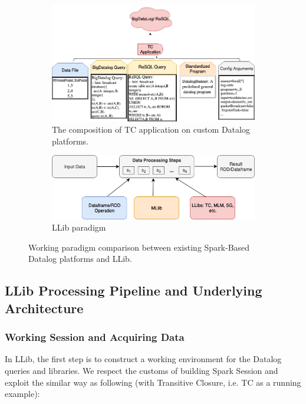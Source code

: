 \begin{figure}[!t]
	\centering
	\begin{subfigure}{0.7\textwidth}
		\centering
		\includegraphics[width=1\linewidth]{Graph/llib/datalogPipeline.png}
		\caption{\small The composition of TC application on custom Datalog platforms. } 
	\end{subfigure}%
	\vspace{\floatsep}
	
	\begin{subfigure}{0.6\textwidth}
		\centering
		\includegraphics[width=1\linewidth]{Graph/llib/DatalogLib-4.png}
		\caption{\small LLib paradigm} 
	\end{subfigure}%
	\caption{Working paradigm comparison between existing Spark-Based Datalog platforms and LLib.}\label{fig:comparison}
	\vspace{-1em}
\end{figure}


\subsection{LLib Processing Pipeline and Underlying Architecture}

\subsubsection{Working Session and Acquiring Data}
\label{sec:data}
In LLib, the first step is to construct a working environment for the Datalog queries and libraries. We respect the customs of building Spark Session and exploit the similar way as following (with Transitive Closure, i.e. TC as a running example):


